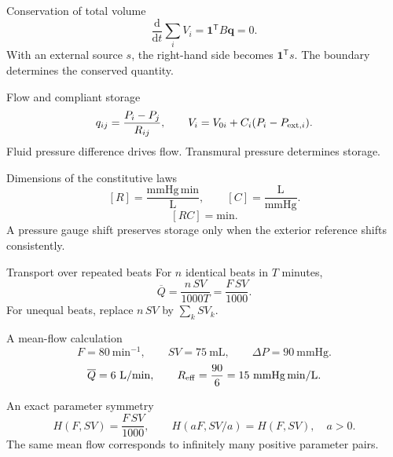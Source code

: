 \documentclass[aspectratio=169,11pt]{beamer}
\newcommand{\notestarget}{notes.pdf}\newcommand{\noteslabel}{Notes}
\begin{document}
\renewcommand{\notestarget}{notes.pdf\#note-a-closed-circulation-as-a-directed-network}
\begin{frame}[t,fragile,label=slide-conservation-of-total-volume]{Conservation of total volume}
\[\frac{\mathrm d}{\mathrm dt}\sum_iV_i=\boldsymbol1^{\mathsf T}B\boldsymbol q=0.\]\pause{}
With an external source $s$, the right-hand side becomes $\boldsymbol1^{\mathsf T}s$. The boundary determines the conserved quantity.
\end{frame}
\renewcommand{\notestarget}{notes.pdf\#note-pressure-storage-and-physical-units}
\begin{frame}[t,fragile,label=slide-flow-and-compliant-storage]{Flow and compliant storage}
\[q_{ij}=\frac{P_i-P_j}{R_{ij}},\qquad V_i=V_{0i}+C_i(P_i-P_{{\rm ext},i}).\]\pause{}
Fluid pressure difference drives flow. Transmural pressure determines storage.
\end{frame}
\renewcommand{\notestarget}{notes.pdf\#note-pressure-storage-and-physical-units}
\begin{frame}[t,fragile,label=slide-dimensions-of-the-constitutive-laws]{Dimensions of the constitutive laws}
\[[R]=\frac{\mathrm{mmHg}\,\mathrm{min}}{\mathrm L},\qquad [C]=\frac{\mathrm L}{\mathrm{mmHg}}.\]\pause{}
\[[RC]=\mathrm{min}.\]
A pressure gauge shift preserves storage only when the exterior reference shifts consistently.
\end{frame}
\renewcommand{\notestarget}{notes.pdf\#note-mean-flow-as-an-observation-map}
\begin{frame}[t,fragile,label=slide-transport-over-repeated-beats]{Transport over repeated beats}
For $n$ identical beats in $T$ minutes,
\[\overline Q=\frac{n\,SV}{1000T}=\frac{F\,SV}{1000}.\]\pause{}
For unequal beats, replace $n\,SV$ by $\sum_k SV_k$.
\end{frame}
\renewcommand{\notestarget}{notes.pdf\#note-mean-flow-as-an-observation-map}
\begin{frame}[t,fragile,label=slide-a-mean-flow-calculation]{A mean-flow calculation}
\[F=80\ \mathrm{min}^{-1},\qquad SV=75\ \mathrm{mL},\qquad \Delta P=90\ \mathrm{mmHg}.\]\pause{}
\[\overline Q=6\ \mathrm{L/min},\qquad R_{\rm eff}=\frac{90}{6}=15\ \mathrm{mmHg\,min/L}.\]
\end{frame}
\renewcommand{\notestarget}{notes.pdf\#note-parameter-symmetries-and-local-identifiability}
\begin{frame}[t,fragile,label=slide-an-exact-parameter-symmetry]{An exact parameter symmetry}
\[H(F,SV)=\frac{F\,SV}{1000},\qquad H(aF,SV/a)=H(F,SV),\quad a>0.\]\pause{}
The same mean flow corresponds to infinitely many positive parameter pairs.
\end{frame}
\end{document}
